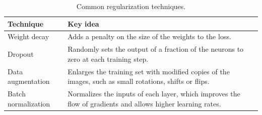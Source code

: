 \begin{table}[t]
  \centering
  \caption{Common regularization techniques.}
  \label{tab:regularization}
  \small
  \begin{tabular}{@{}p{}p{}@{}}
    \toprule
    Technique & Key idea \\
    \midrule
    Weight decay      & Adds a penalty on the size of the weights to the loss. \\
    Dropout           & Randomly sets the output of a fraction of the neurons to zero at each training step. \\
    Data augmentation & Enlarges the training set with modified copies of the images, such as small rotations, shifts or flips. \\
    Batch normalization & Normalizes the inputs of each layer, which improves the flow of gradients and allows higher learning rates. \\
    \bottomrule
  \end{tabular}
\end{table}
